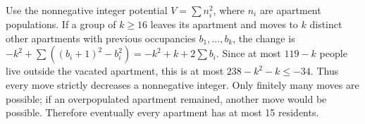 Use the nonnegative integer potential $V=\sum n_i^2$, where $n_i$ are apartment populations. If a group of $k\ge16$ leaves its apartment and moves to $k$ distinct other apartments with previous occupancies $b_1,\ldots,b_k$, the change is $-k^2+\sum((b_i+1)^2-b_i^2)=-k^2+k+2\sum b_i$. Since at most $119-k$ people live outside the vacated apartment, this is at most $238-k^2-k\le-34$. Thus every move strictly decreases a nonnegative integer. Only finitely many moves are possible; if an overpopulated apartment remained, another move would be possible. Therefore eventually every apartment has at most 15 residents.
